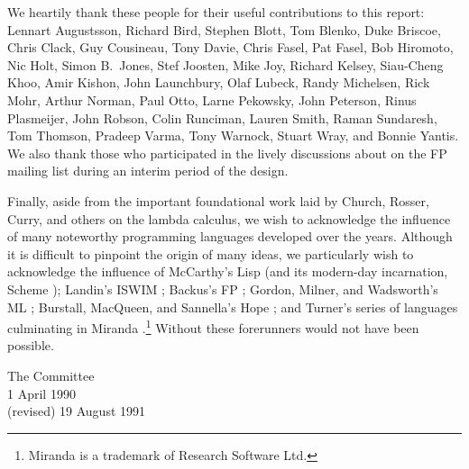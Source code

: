 We heartily thank these people for their useful contributions
to this report:
Lennart Augustsson,
Richard Bird,
Stephen Blott,
Tom Blenko,
Duke Briscoe,
Chris Clack,
Guy Cousineau,
Tony Davie,
Chris Fasel,
Pat Fasel, 
Bob Hiromoto,
Nic Holt,
Simon B.~Jones, 
Stef Joosten, 
Mike Joy,
Richard Kelsey,
Siau-Cheng Khoo, 
Amir Kishon, 
John Launchbury,
Olaf Lubeck, 
Randy Michelsen, 
Rick Mohr,
Arthur Norman,
Paul Otto, 
Larne Pekowsky,
John Peterson,
Rinus Plasmeijer,  
John Robson, 
Colin Runciman, 
Lauren Smith, 
Raman Sundaresh,
Tom Thomson,
Pradeep Varma,
Tony Warnock,
Stuart Wray,
and Bonnie Yantis.
We also thank those who participated in the lively discussions
about \Haskell{} on the FP mailing list during an interim period of
the design.


Finally, aside from the important foundational work laid by Church,
Rosser, Curry, and others on the lambda calculus, we wish to
acknowledge the influence of many noteworthy programming languages
developed over the years.  Although it is difficult to pinpoint the
origin of many ideas, we particularly wish to acknowledge the
influence of McCarthy's Lisp \cite{mcca60} (and its modern-day
incarnation, Scheme \cite{RRRRS}); Landin's ISWIM \cite{landin66};
Backus's FP \cite{back78}; Gordon, Milner, and Wadsworth's ML
\cite{gordonetal78}; Burstall, MacQueen, and Sannella's Hope
\cite{burs80}; and Turner's series of languages culminating in
Miranda \cite{turn85}.\footnote{{\rm Miranda} is a trademark of
Research Software Ltd.} Without these forerunners \Haskell{} would
not have been possible.

\begin{flushright}
The \Haskell{} Committee\\
1 April 1990\\
(revised) 19 August 1991
\end{flushright}


